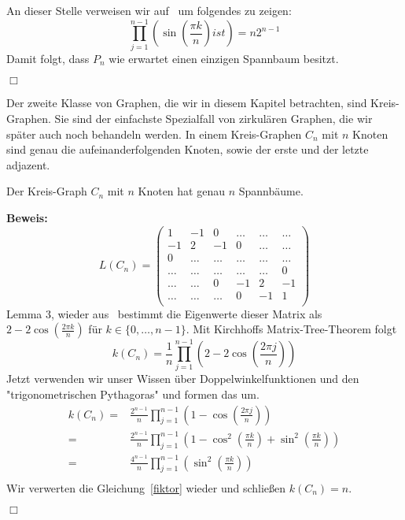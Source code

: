 An dieser Stelle verweisen wir auf~\cite{fiktor_2010} um folgendes zu zeigen:
\begin{equation}
 \prod_{j=1}^{n-1} \left(\sin\left(\frac{\pi k}{n}\right) ist \right)=n2^{n-1}
 \label{fiktor}
\end{equation}
Damit folgt, dass $P_n$ wie erwartet einen einzigen Spannbaum besitzt.
\begin{flushright} $\Box$ \end{flushright}
Der zweite Klasse von Graphen, die wir in diesem Kapitel betrachten, sind Kreis-Graphen.
Sie sind der einfachste Spezialfall von zirkulären Graphen, die wir später auch noch behandeln werden. In einem Kreis-Graphen $C_n$ mit $n$ Knoten sind genau die aufeinanderfolgenden Knoten, sowie der erste und der letzte adjazent. 
\begin{Lms}
 Der Kreis-Graph $C_n$ mit $n$ Knoten hat genau $n$ Spannbäume.
\end{Lms}
\textbf{Beweis:}
\begin{equation}
L(C_n)=
\begin{pmatrix}
1&-1&0&\ldots&\ldots&\ldots\\
-1&2&-1&0&\ldots&\ldots\\
0&\ldots&\ldots&\ldots&\ldots&\ldots\\
\ldots&\ldots&\ldots&\ldots&\ldots&0\\
\ldots&\ldots&0&-1&2&-1\\
\ldots&\ldots&\ldots&0&-1&1\\
\end{pmatrix}
\end{equation}
Lemma 3, wieder aus~\cite{daoud_2014} bestimmt die Eigenwerte 
dieser Matrix als $2-2\cos {\left(\frac{2\pi k}{n}\right)}$ für $k \in \{0,\ldots,n-1\}$.
Mit Kirchhoffs Matrix-Tree-Theorem folgt
\begin{equation}
 \mathit{k}(C_n)=\frac{1}{n}\prod_{j=1}^{n-1} \left(2-2\cos \left(\frac{2\pi j}{n}\right)\right)
\end{equation}
Jetzt verwenden wir unser Wissen über Doppelwinkelfunktionen und den "trigonometrischen Pythagoras" und formen das um.
\begin{equation}
\begin{split}
 \mathit{k}(C_n)={} & \frac{2^{n-1}}{n}\prod_{j=1}^{n-1} \left(1-\cos \left(\frac{2\pi j}{n}\right)\right)\\
 = {}&\frac{2^{n-1}}{n}\prod_{j=1}^{n-1} \left( 1 - \cos^2\left(\frac{\pi k}{n}\right)+\sin^2\left(\frac{\pi k}{n}\right) \right)\\
 = {}& \frac{4^{n-1}}{n}\prod_{j=1}^{n-1} \left(\sin^2\left(\frac{\pi k}{n}\right) \right)\\
\end{split}
\end{equation}
Wir verwerten die Gleichung~\ref{fiktor} wieder und schließen $\mathit{k}(C_n)=n$.
\begin{flushright} $\Box$ \end{flushright} 
